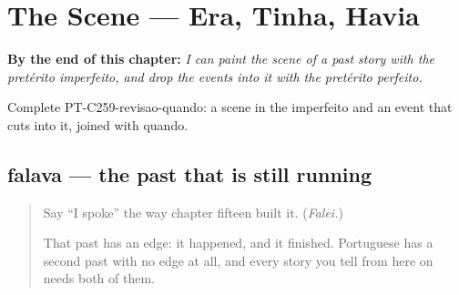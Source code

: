 
\chapter{The Scene --- Era, Tinha, Havia}
\label{ch:pt-the-scene}

\begin{chapteropening}
\textbf{By the end of this chapter:} \emph{I can paint the scene of a past story with the pretérito imperfeito, and drop the events into it with the pretérito perfeito.}

Complete PT-C259-revisao-quando: a scene in the imperfeito and an event that cuts into it, joined with quando.
\end{chapteropening}

\section[falava, comia, partia]{falava — the past that is still running}

\label{lesson:PT-C259-falava}



\begin{quote}
Say \textquotedblleft{}I spoke\textquotedblright{} the way chapter fifteen built it. (\emph{Falei.})

That past has an edge: it happened, and it finished. Portuguese has a second past with no edge at all, and every story you tell from here on needs both of them.
\end{quote}

